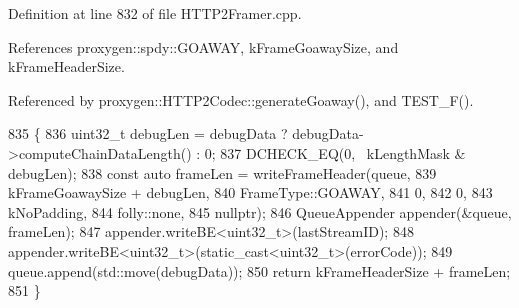 Definition at line 832 of file H\+T\+T\+P2\+Framer.\+cpp.



References proxygen\+::spdy\+::\+G\+O\+A\+W\+AY, k\+Frame\+Goaway\+Size, and k\+Frame\+Header\+Size.



Referenced by proxygen\+::\+H\+T\+T\+P2\+Codec\+::generate\+Goaway(), and T\+E\+S\+T\+\_\+\+F().


\begin{DoxyCode}
835                                                      \{
836   uint32\_t debugLen = debugData ? debugData->computeChainDataLength() : 0;
837   DCHECK\_EQ(0, ~kLengthMask & debugLen);
838   \textcolor{keyword}{const} \textcolor{keyword}{auto} frameLen = writeFrameHeader(queue,
839                                          kFrameGoawaySize + debugLen,
840                                          FrameType::GOAWAY,
841                                          0,
842                                          0,
843                                          kNoPadding,
844                                          folly::none,
845                                          \textcolor{keyword}{nullptr});
846   QueueAppender appender(&queue, frameLen);
847   appender.writeBE<uint32\_t>(lastStreamID);
848   appender.writeBE<uint32\_t>(\textcolor{keyword}{static\_cast<}uint32\_t\textcolor{keyword}{>}(errorCode));
849   queue.append(std::move(debugData));
850   \textcolor{keywordflow}{return} kFrameHeaderSize + frameLen;
851 \}
\end{DoxyCode}
